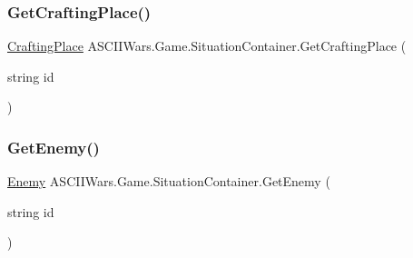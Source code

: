 \hypertarget{class_a_s_c_i_i_wars_1_1_game_1_1_situation_container_a537f25cbf5d97a989954c421b6ea1a21}{}\label{class_a_s_c_i_i_wars_1_1_game_1_1_situation_container_a537f25cbf5d97a989954c421b6ea1a21} 
\subsubsection{\texorpdfstring{Get\+Crafting\+Place()}{GetCraftingPlace()}}
{\footnotesize\ttfamily \hyperlink{class_a_s_c_i_i_wars_1_1_game_1_1_crafting_place}{Crafting\+Place} A\+S\+C\+I\+I\+Wars.\+Game.\+Situation\+Container.\+Get\+Crafting\+Place (\begin{DoxyParamCaption}\item[{string}]{id }\end{DoxyParamCaption})\hspace{0.3cm}{\ttfamily [inline]}}

\hypertarget{class_a_s_c_i_i_wars_1_1_game_1_1_situation_container_a559089971fe865f682768b43173181c4}{}\label{class_a_s_c_i_i_wars_1_1_game_1_1_situation_container_a559089971fe865f682768b43173181c4} 
\subsubsection{\texorpdfstring{Get\+Enemy()}{GetEnemy()}}
{\footnotesize\ttfamily \hyperlink{class_a_s_c_i_i_wars_1_1_game_1_1_enemy}{Enemy} A\+S\+C\+I\+I\+Wars.\+Game.\+Situation\+Container.\+Get\+Enemy (\begin{DoxyParamCaption}\item[{string}]{id }\end{DoxyParamCaption})\hspace{0.3cm}{\ttfamily [inline]}}

\hypertarget{class_a_s_c_i_i_wars_1_1_game_1_1_situation_container_a1e6b56a5e6db3eec1b59414956c245ae}{}\label{class_a_s_c_i_i_wars_1_1_game_1_1_situation_container_a1e6b56a5e6db3eec1b59414956c245ae} 
